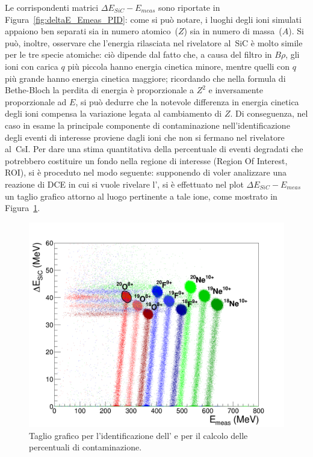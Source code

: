 Le corrispondenti matrici $\Delta E_{SiC} - E_{meas}$ sono riportate in Figura~\ref{fig:deltaE_Emeas_PID}: come si può notare, i luoghi degli ioni simulati appaiono ben separati sia in numero atomico~($Z$) sia in numero di massa~($A$).
Si può, inoltre, osservare che l'energia rilasciata nel rivelatore al~SiC è molto simile per le tre specie atomiche: 
ciò dipende dal fatto che, a causa del filtro in $B \rho$, gli ioni con carica $q$ più piccola hanno energia cinetica minore, mentre quelli con $q$ più grande hanno energia cinetica maggiore; ricordando che nella formula di Bethe-Bloch la perdita di energia è proporzionale a $Z^2$ e inversamente proporzionale ad $E$, si può dedurre che la notevole differenza in energia cinetica degli ioni compensa la variazione legata al cambiamento di $Z$.
Di conseguenza, nel caso in esame la principale componente di contaminazione nell'identificazione degli eventi di interesse proviene dagli ioni che non si fermano nel rivelatore al~CsI.
Per dare una stima quantitativa della percentuale di eventi degradati che potrebbero costituire un fondo nella regione di interesse (Region Of Interest, ROI), si è proceduto nel modo seguente: supponendo di voler analizzare una reazione di DCE in cui si vuole rivelare l', si è effettuato nel plot $\Delta E_{SiC} - E_{meas}$ un taglio grafico attorno al luogo pertinente a tale ione, come mostrato in Figura~\ref{fig:deltaE_Emeas_taglioa}.
\begin{figure} [!p]
	\centering
	\includegraphics[width=\textwidth, keepaspectratio]{Grafici_Tesi2/PID/deltaE_Emeas_quadrata_taglio_label.png}
	\caption{Taglio grafico per l'identificazione dell' e per il calcolo delle percentuali di contaminazione.} \label{fig:deltaE_Emeas_taglioa}
\end{figure}
